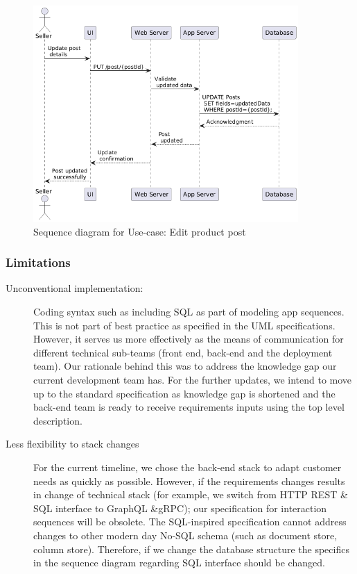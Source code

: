 \begin{figure}[!h]
	\centering
	\includegraphics[width=0.9\textwidth]{chapters/ch-04/305_usecase_edit_post.png} %
	\caption{Sequence diagram for Use-case: Edit product post}
	\label{fig:seq_06} %
\end{figure}

\subsubsection{Limitations}

\begin{description}
	\item[Unconventional implementation:] Coding syntax such as including SQL as part of modeling app sequences. This is not part of best practice as specified in the UML specifications. However, it serves us more effectively as the means of communication for different technical sub-teams (front end, back-end and the deployment team). Our rationale behind this was to address the knowledge gap our current development team has. For the further updates, we intend to move up to the standard specification as knowledge gap is shortened and the back-end team is ready to receive requirements inputs using the top level description.
	\item[Less flexibility to stack changes] For the current timeline, we chose the back-end stack to adapt customer needs as quickly as possible. However, if the requirements changes results in change of technical stack (for example, we switch from HTTP REST \& SQL interface to GraphQL \&gRPC); our specification for interaction sequences will be obsolete. The SQL-inspired specification cannot address changes to other modern day No-SQL schema (such as document store, column store). Therefore, if we change the database structure the specifics in the sequence diagram regarding SQL interface should be changed.
\end{description}

